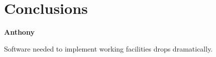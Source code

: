 \section{Conclusions}

\textbf{Anthony}

Software needed to implement working facilities drops dramatically.